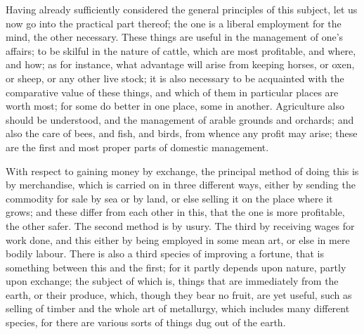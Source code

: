 
Having already sufficiently considered the general principles of this
subject, let us now go into the practical part thereof; the one is a
liberal employment for the mind, the other necessary. These things are
useful in the management of one's affairs; to be skilful in the nature of
cattle, which are most profitable, and where, and how; as for instance,
what advantage will arise from keeping horses, or oxen, or sheep, or any
other live stock; it is also necessary to be acquainted with the
comparative value of these things, and which of them in particular places
are worth most; for some do better in one place, some in another.
Agriculture also should be understood, and the management of arable
grounds and orchards; and also the care of bees, and fish, and birds, from
whence any profit may arise; these are the first and most proper parts of
domestic management.

With respect to gaining money by exchange, the principal method of doing
this is by merchandise, which is carried on in three different ways,
either by sending the commodity for sale by sea or by land, or else
selling it on the place where it grows; and these differ from each other
in this, that the one is more profitable, the other safer. The second
method is by usury. The third by receiving wages for work done, and this
either by being employed in some mean art, or else in mere bodily labour.
There is also a third species of improving a fortune, that is something
between this and the first; for it partly depends upon nature, partly upon
exchange; the subject of which is, things that are immediately from the
earth, or their produce, which, though they bear no fruit, are yet useful,
such as selling of timber and the whole art of metallurgy, which includes
many different species, for there are various sorts of things dug out of
the earth.


